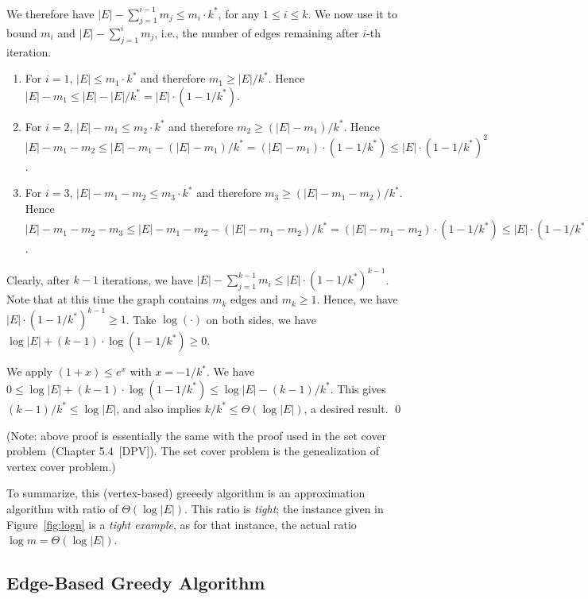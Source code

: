 We therefore have $|E| - \sum_{j=1}^{i-1} m_j \le  m_i \cdot k^*$, for any $1\le i \le k$.
We now use it to bound $m_i$ and $|E| - \sum_{j=1}^{i} m_j$, i.e., the number of edges remaining after $i$-th iteration. 
\vspace*{-\topsep}
\begin{enumerate}
\item For $i = 1$, $|E| \le m_1 \cdot k^*$ and therefore $m_1 \ge |E| / k^*$.
Hence $|E| - m_1 \le |E| - |E|/k^* = |E| \cdot (1-1/k^*)$.

\item For $i = 2$, $|E| - m_1 \le m_2 \cdot k^*$ and therefore $m_2 \ge (|E| - m_1) / k^*$.
Hence $|E| - m_1 - m_2 \le |E| - m_1 - (|E| - m_1)/k^* = (|E| - m_1) \cdot (1-1/k^*) \le |E|\cdot(1-1/k^*)^2$.

\item For $i = 3$, $|E| - m_1 - m_2 \le m_3 \cdot k^*$ and therefore $m_3 \ge (|E| - m_1 - m_2) / k^*$.
Hence $|E| - m_1 - m_2 - m_3\le |E| - m_1 - m_2 - (|E| - m_1 - m_2)/k^* = (|E| - m_1 - m_2) \cdot (1-1/k^*) \le |E|\cdot(1-1/k^*)^3$.
\end{enumerate}

Clearly, after $k-1$ iterations, 
we have $|E| - \sum_{j=1}^{k-1} m_i \le |E| \cdot (1-1/k^*)^{k-1}$.
Note that at this time the graph contains $m_k$ edges and $m_k \ge 1$.
Hence, we have $|E| \cdot (1-1/k^*)^{k-1} \ge 1$.
Take $\log(\cdot)$ on both sides, we have $\log |E| + (k-1)\cdot \log (1-1/k^*) \ge 0$.

We apply $(1+x)\le e^x$ with $x = -1/k^*$.
We have $0 \le \log |E| + (k-1)\cdot \log (1-1/k^*) \le \log |E| - (k-1)/k^*$.
This gives $(k-1)/k^* \le \log |E|$, and also implies 
$k/k^* \le \Theta(\log |E|)$, a desired result. \qed

(Note: above proof is essentially the same with the proof used in the set cover problem~(Chapter 5.4~[DPV]).
The set cover problem is the genealization of vertex cover problem.)

To summarize, this (vertex-based) greeedy algorithm is an approximation algorithm with ratio of $\Theta(\log |E|)$.
This ratio is \emph{tight}; the instance given in Figure~\ref{fig:logn} is a \emph{tight example},
as for that instance, the actual ratio $\log m = \Theta(\log |E|)$.


\subsection*{Edge-Based Greedy Algorithm}

